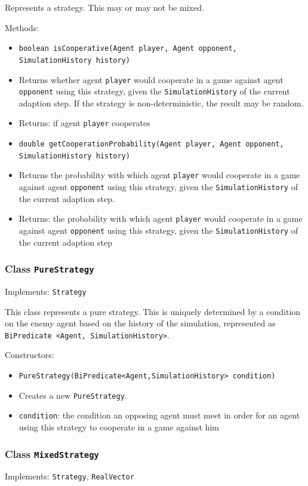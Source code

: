 \documentclass[parskip=full,11pt]{scrartcl}
\begin{document}
Represents a strategy. This may or may not be mixed.

Methods:
\begin{itemize}\itemsep -10pt
\item \texttt{boolean isCooperative(Agent player, Agent opponent, SimulationHistory history)}
\item[] Returns whether agent \texttt{player} would cooperate in a game against agent \texttt{opponent} using this strategy, given the \texttt{SimulationHistory} of the current adaption step. If the strategy is non-deterministic, the result may be random.
\item[] Returns: if agent \texttt{player} cooperates

\item \texttt{double getCooperationProbability(Agent player, Agent opponent, SimulationHistory history)}
\item[] Returns the probability with which agent \texttt{player} would cooperate in a game against agent \texttt{opponent} using this strategy, given the \texttt{SimulationHistory} of the current adaption step.
\item[] Returns: the probability with which agent \texttt{player} would cooperate in a game against agent \texttt{opponent} using this strategy, given the \texttt{SimulationHistory} of the current adaption step
\end{itemize}

\subsubsection{Class \texttt{PureStrategy}}
Implements: \texttt{Strategy}

This class represents a pure strategy. This is uniquely determined by a condition on the enemy agent based on the history of the simulation, represented as \texttt{BiPredicate <Agent, SimulationHistory>}.

Constructors:
\begin{itemize}\itemsep -10pt
\item \texttt{PureStrategy(BiPredicate<Agent,SimulationHistory> condition)}
\item[] Creates a new \texttt{PureStrategy}.
\item[] \texttt{condition}: the condition an opposing agent must meet in order for an agent using this strategy to cooperate in a game against him
\end{itemize}

\subsubsection{Class \texttt{MixedStrategy}}
Implements: \texttt{Strategy}, \texttt{RealVector}
\end{document}
